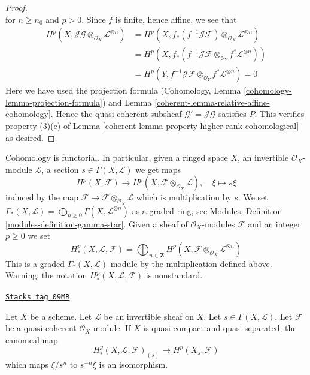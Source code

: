 \begin{proof}
$$$$
for $n \geq n_0$ and $p > 0$. Since $f$ is finite, hence affine, we see that
\begin{align*}
H^p(X, \mathcal{J}\mathcal{G} \otimes_{\mathcal{O}_X}
\mathcal{L}^{\otimes n})
& =
H^p(X, f_*(f^{-1}\mathcal{J}\mathcal{F}) \otimes_{\mathcal{O}_X}
\mathcal{L}^{\otimes n}) \\
& =
H^p(X, f_*(f^{-1}\mathcal{J}\mathcal{F} \otimes_{\mathcal{O}_Y}
f^*\mathcal{L}^{\otimes n})) \\
& =
H^p(Y, f^{-1}\mathcal{J}\mathcal{F} \otimes_{\mathcal{O}_Y}
f^*\mathcal{L}^{\otimes n}) = 0
\end{align*}
Here we have used the projection formula
(Cohomology, Lemma \ref{cohomology-lemma-projection-formula}) and
Lemma \ref{coherent-lemma-relative-affine-cohomology}.
Hence the quasi-coherent subsheaf $\mathcal{G}' = \mathcal{J}\mathcal{G}$
satisfies $P$. This verifies property (3)(c) of
Lemma \ref{coherent-lemma-property-higher-rank-cohomological} as desired.
\end{proof}

Cohomology is functorial. In particular, given a ringed space $X$,
an invertible $\mathcal{O}_X$-module $\mathcal{L}$, a section
$s \in \Gamma(X, \mathcal{L})$ we get maps
$$
H^p(X, \mathcal{F})
\longrightarrow
H^p(X, \mathcal{F} \otimes_{\mathcal{O}_X} \mathcal{L}), \quad
\xi \longmapsto s\xi
$$
induced by the map
$\mathcal{F} \to \mathcal{F} \otimes_{\mathcal{O}_X} \mathcal{L}$
which is multiplication by $s$. We set
$\Gamma_*(X, \mathcal{L}) =
\bigoplus_{n \geq 0} \Gamma(X, \mathcal{L}^{\otimes n})$
as a graded ring, see
Modules, Definition \ref{modules-definition-gamma-star}.
Given a sheaf of $\mathcal{O}_X$-modules $\mathcal{F}$ and an integer
$p \geq 0$ we set
$$
H^p_*(X, \mathcal{L}, \mathcal{F}) =
\bigoplus\nolimits_{n \in \mathbf{Z}} H^p(X,
\mathcal{F} \otimes_{\mathcal{O}_X} \mathcal{L}^{\otimes n})
$$
This is a graded $\Gamma_*(X, \mathcal{L})$-module by the multiplication
defined above. Warning: the notation $H^p_*(X, \mathcal{L}, \mathcal{F})$
is nonstandard.

\begin{lemma}
\label{coherent-lemma-invert-s-cohomology}
\href{https://stacks.math.columbia.edu/tag/09MR}{\texttt{Stacks tag 09MR}}

Let $X$ be a scheme. Let $\mathcal{L}$ be an invertible sheaf on $X$.
Let $s \in \Gamma(X, \mathcal{L})$.
Let $\mathcal{F}$ be a quasi-coherent $\mathcal{O}_X$-module.
If $X$ is quasi-compact and quasi-separated, the canonical map
$$
H^p_*(X, \mathcal{L}, \mathcal{F})_{(s)}
\longrightarrow
H^p(X_s, \mathcal{F})
$$
which maps $\xi/s^n$ to $s^{-n}\xi$ is an isomorphism.
\end{lemma}

